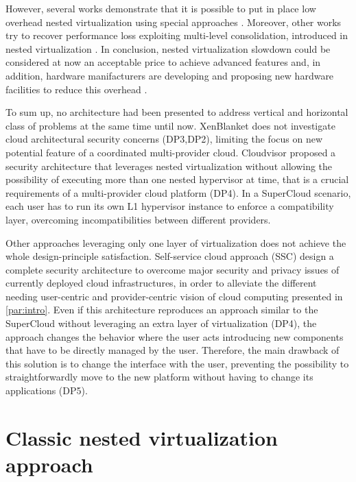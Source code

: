 \documentclass{acm_proc_article-sp} %
\begin{document}
However, several works demonstrate that it is possible to put in place low overhead nested virtualization using special approaches \cite{turtle:ibm} . Moreover, other works try to recover performance loss exploiting multi-level consolidation, introduced in nested virtualization \cite{art:blan}. In conclusion, nested virtualization slowdown could be considered at now an acceptable price to achieve advanced features and, in addition, hardware manifacturers are developing and proposing new hardware facilities to reduce this overhead \cite{vmcs:nakajima}.

To sum up, no architecture had been presented to address vertical and horizontal class of problems at the same time until now. XenBlanket does not investigate cloud architectural security concerns (DP3,DP2), limiting the focus on new potential feature of a coordinated multi-provider cloud. Cloudvisor proposed a security architecture that leverages nested virtualization without allowing the possibility of executing more than one nested hypervisor at time, that is a crucial requirements of a multi-provider cloud platform (DP4). In a SuperCloud scenario, each user has to run its own L1 hypervisor instance to enforce a compatibility layer, overcoming incompatibilities between different providers.

Other approaches leveraging only one layer of virtualization does not achieve the whole design-principle satisfaction. Self-service cloud approach (SSC) \cite{ssc:art} design a complete security architecture to overcome major security and privacy issues of currently deployed cloud infrastructures, in order to alleviate the different needing user-centric and provider-centric vision of cloud computing presented in \ref{par:intro}. Even if this architecture reproduces an approach similar to the SuperCloud without leveraging an extra layer of virtualization (DP4), the approach changes the behavior where the user acts introducing new components that have to be directly managed by the user. Therefore, the main drawback of this solution is to change the interface with the user, preventing the possibility to straightforwardly move to the new platform without having to change its applications (DP5).

\section{Classic nested virtualization approach}
\end{document}
